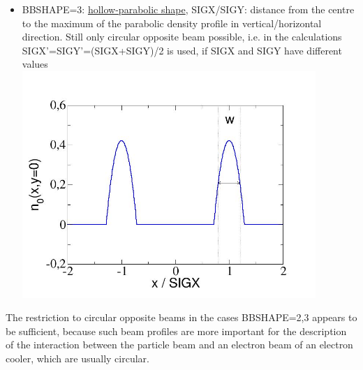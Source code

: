 \begin{itemize}
\begin{itemize}
\label{fig:beambeam_n_trapez}
\\
        \item  BBSHAPE=3: \href{beambeam_n_hollowparabol.jpg}{hollow-parabolic shape}, 
          SIGX/SIGY: distance from the centre 
          to the maximum of the parabolic density profile in vertical/horizontal 
          direction. Still only circular opposite beam possible, 
          i.e. in the calculations 
          SIGX'=SIGY'=(SIGX+SIGY)/2 is used, if SIGX and SIGY have different values 
\\
\includegraphics[width=420px]{Introduction/beambeam_n_hollowparabol.jpg}
\label{fig:beambeam_n_hollowparabol}
\\
     \end{itemize}
     
     The restriction to circular opposite beams in the cases BBSHAPE=2,3 
     appears to be sufficient, because such beam profiles are more important 
     for the description of the interaction between the particle beam and 
     an electron beam of an electron cooler, which are usually circular. 
     

\end{itemize}
